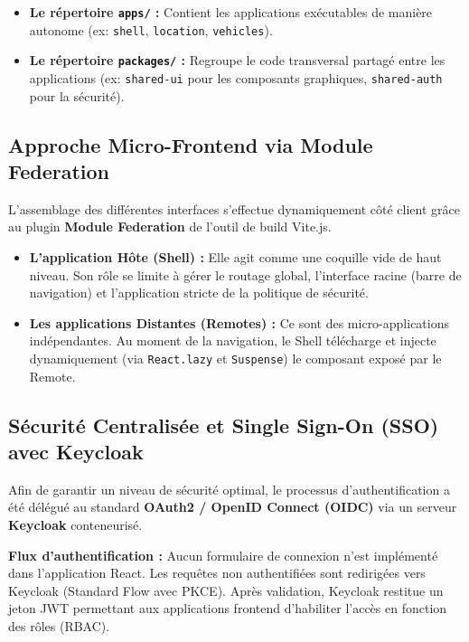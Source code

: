 \documentclass[12pt,a4paper]{article}
\begin{document}
\begin{itemize}[leftmargin=*]
  \item \textbf{Le r\'{e}pertoire \texttt{apps/} :} Contient les applications ex\'{e}cutables de mani\`{e}re autonome (ex: \texttt{shell}, \texttt{location}, \texttt{vehicles}).
  \item \textbf{Le r\'{e}pertoire \texttt{packages/} :} Regroupe le code transversal partag\'{e} entre les applications (ex: \texttt{shared-ui} pour les composants graphiques, \texttt{shared-auth} pour la s\'{e}curit\'{e}).
\end{itemize}

\subsection{Approche Micro-Frontend via Module Federation}

L'assemblage des diff\'{e}rentes interfaces s'effectue dynamiquement c\^{o}t\'{e} client gr\^{a}ce au plugin \textbf{Module Federation} de l'outil de build Vite.js.

\begin{itemize}[leftmargin=*]
  \item \textbf{L'application H\^{o}te (Shell) :} Elle agit comme une coquille vide de haut niveau. Son r\^{o}le se limite \`{a} g\'{e}rer le routage global, l'interface racine (barre de navigation) et l'application stricte de la politique de s\'{e}curit\'{e}.
  \item \textbf{Les applications Distantes (Remotes) :} Ce sont des micro-applications ind\'{e}pendantes. Au moment de la navigation, le Shell t\'{e}l\'{e}charge et injecte dynamiquement (via \texttt{React.lazy} et \texttt{Suspense}) le composant expos\'{e} par le Remote.
\end{itemize}

\subsection{S\'{e}curit\'{e} Centralis\'{e}e et Single Sign-On (SSO) avec Keycloak}

Afin de garantir un niveau de s\'{e}curit\'{e} optimal, le processus d'authentification a \'{e}t\'{e} d\'{e}l\'{e}gu\'{e} au standard \textbf{OAuth2 / OpenID Connect (OIDC)} via un serveur \textbf{Keycloak} conteneuris\'{e}.

\begin{infobox}
\textbf{Flux d'authentification :} Aucun formulaire de connexion n'est impl\'{e}ment\'{e} dans l'application React. Les requ\^{e}tes non authentifi\'{e}es sont redirig\'{e}es vers Keycloak (Standard Flow avec PKCE). Apr\`{e}s validation, Keycloak restitue un jeton JWT permettant aux applications frontend d'habiliter l'acc\`{e}s en fonction des r\^{o}les (RBAC).
\end{infobox}
\end{document}
